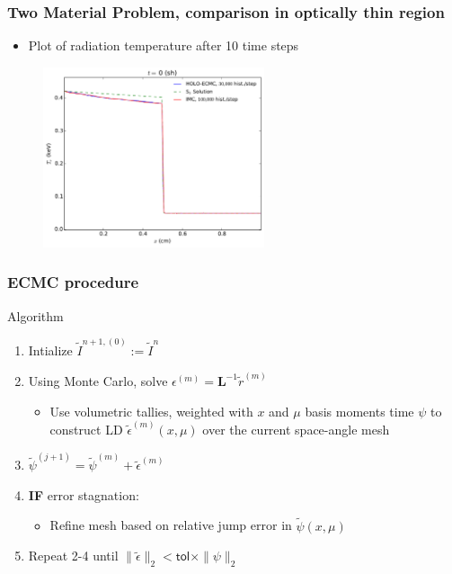 \documentclass[xcolor=dvipsnames,hyperref={pdfpagelabels=false},unknownkeysallowed]{beamer}
\newlength{\wideitemsep}
\let\olditem\item
\renewcommand{\item}{\setlength{\itemsep}{\wideitemsep}\olditem}
\newcommand{\B}[1]{\ensuremath{\mathbf{#1}}}
\begin{document}
\begin{frame}
    \frametitle{Two Material Problem, comparison in optically thin region}
    \begin{block}{}
        \begin{itemize}
            \item Plot of radiation temperature after 10 time steps
        \end{itemize}
    \end{block}
\begin{figure}
    \centering
    \includegraphics[width=0.5799\textwidth]{quick_compare.pdf}
\end{figure}

\end{frame}



\begin{frame}
    \frametitle{ECMC procedure}
    {
    \begin{block}{Algorithm}
    \begin{enumerate}
        \item Intialize $\tilde I^{n+1,(0)}:=\tilde I^{n}$
        \item Using Monte Carlo, solve $\epsilon^{(m)} = \B L^{-1} \tilde r^{(m)}$
            \begin{itemize}
                \item Use volumetric tallies, weighted with $x$ and $\mu$ basis moments time $\psi$ to construct LD
                    $\tilde\epsilon^{(m)}(x,\mu)$ over the current space-angle mesh
            \end{itemize}
        \item $\tilde \psi^{(j+1)} = \tilde \psi^{(m)} + \tilde \epsilon^{(m)}$
        \item \textbf{IF} error stagnation:
            \begin{itemize}
                \item Refine mesh based on relative jump error in $\tilde \psi(x,\mu)$
            \end{itemize}
        \item Repeat 2-4 until $\| \tilde \epsilon \|_2 < \textsf{tol}\times
            \|\psi\|_2$
    \end{enumerate}
    \end{block}
}
\end{frame}
\end{document}
